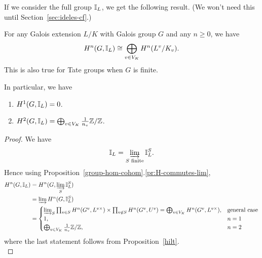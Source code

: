 If we consider the full group $\mathbb{I}_L$, we get the following result. (We won't need this until Section~\ref{sec:ideles-cf}.)
\begin{pr}
For any Galois extension $L/K$ with Galois group $G$ and any $n\ge 0$, we have
\[
H^n(G,\mathbb{I}_L)\cong \bigoplus_{v\in V_K} H^n(L^v/K_v).
\]
This is also true for Tate groups when $G$ is finite.

In particular, we have
\begin{enumerate}
\item
$H^1(G,\mathbb{I}_L)=0$.
\item
$H^2(G,\mathbb{I}_L)=\bigoplus_{v\in V_K} \frac{1}{n_v}\mathbb{Z}/\mathbb{Z}$.
\end{enumerate}
\end{pr}
\begin{proof}
We have
\[
\mathbb{I}_L=\varinjlim_{S\text{ finite}} \mathbb{I}_L^S.
\]
Hence using Proposition~\ref{group-hom-cohom}.\ref{pr:H-commutes-lim},
\begin{align*}
H^n(G,\mathbb{I}_L)&=H^n(G,\varinjlim_S \mathbb{I}_L^S)\\
&=\varinjlim H^n(G,\mathbb{I}_L^S)\\
&=
\begin{cases}
\varinjlim_S \prod_{v\in S}H^n(G^v,L^{v\times})\times \prod_{v\not\in S} H^n(G^v,U^v)=\bigoplus_{v\in V_K}H^n(G^v,L^{v\times}),&\text{general case}\\
1,&n=1\\
\bigoplus_{v\in V_K} \frac{1}{n_v}\mathbb{Z}/\mathbb{Z},&n=2
\end{cases}
\end{align*}
where the last statement follows from Proposition~\ref{hilt}.\\
\end{proof}
